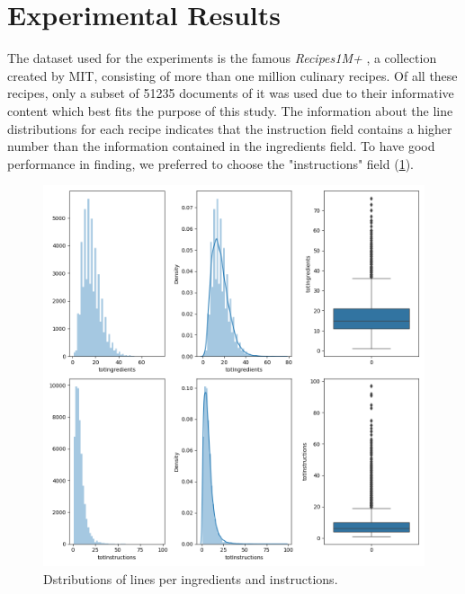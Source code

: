 \section*{Experimental Results}

The dataset used for the experiments is the famous \emph{Recipes1M+} \cite{15}, a collection 
created by MIT, consisting of more than one million culinary recipes. 
Of all these recipes, only a subset of 51235 documents of it was used due 
to their informative content which best fits the purpose of this study. The 
information about the line distributions for each recipe indicates that the 
instruction field contains a higher number than the information contained in 
the ingredients field. To have good performance in finding, we preferred to 
choose the "instructions" field (\ref{distributions}).

\begin{figure}[h!]
    \centering
    \includegraphics[width = 0.7 \linewidth]{images/displot.png}
    \centering
    \caption{Dstributions of lines per ingredients and instructions.}
    \label{distributions}
\end{figure}